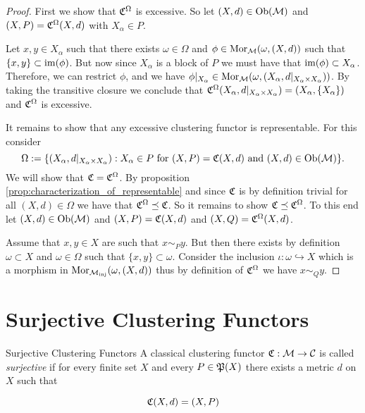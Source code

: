 \begin{proof}
First we show that $\Cf^\Omega$ is excessive. So let $(X,d) \in \ob(\M)$ and $(X,P) = \Cf^\Omega(X,d)$ with $X_\alpha \in P$.

Let $x,y \in X_\alpha$ such that there exists $\omega \in \Omega$ and $\phi \in \mor_\M(\omega, (X,d))$ such that $\{x,y\} \subset \image(\phi)$. But now since $X_\alpha$ is a block of $P$ we must have that $\image(\phi) \subset X_\alpha$. Therefore, we can restrict $\phi$, and we have $\phi|_{X_\alpha} \in \mor_\M(\omega, (X_\alpha, d|_{X_\alpha \times X_\alpha}))$. By taking the transitive closure we conclude that $\Cf^\Omega(X_\alpha, d|_{X_\alpha \times X_\alpha}) = (X_\alpha, \{X_\alpha\})$ and $\Cf^\Omega$ is excessive.

It remains to show that any excessive clustering functor is representable. For this consider
$$
\Omega := \{(X_\alpha, d|_{X_\alpha \times X_\alpha}): X_\alpha \in P \text{ for } (X, P) = \Cf(X,d) \text{ and } (X,d) \in \ob(\M)\}.
$$
We will show that $\Cf = \Cf^\Omega$. By proposition \ref{prop:characterization_of_representable} and since $\Cf$ is by definition trivial for all $(X,d) \in \Omega$ we have that $\Cf^\Omega \refines \Cf$. So it remains to show $\Cf \refines \Cf^\Omega$. To this end let $(X,d) \in \ob(\M)$ and $(X,P) = \Cf(X,d)$ and $(X,Q) = \Cf^\Omega(X,d)$.

Assume that $x,y \in X$ are such that $x \sim_P y$. But then there exists by definition $\omega \subset X$ and $\omega \in \Omega$ such that $\{x,y\} \subset \omega$. Consider the inclusion $\iota: \omega \hookrightarrow X$ which is a morphism in $\mor_\inj(\omega, (X,d))$ thus by definition of $\Cf^\Omega$ we have $x \sim_Q y$.

\end{proof}

\section{Surjective Clustering Functors}

\begin{definition}{Surjective Clustering Functors}{}
    A classical clustering functor $\Cf: \M \to \C$ is called \emph{surjective} if for every finite set $X$ and every $P \in \P(X)$ there exists a metric $d$ on $X$ such that

    \begin{equation*}
        \Cf(X,d) = (X,P)
    \end{equation*}

\end{definition}

